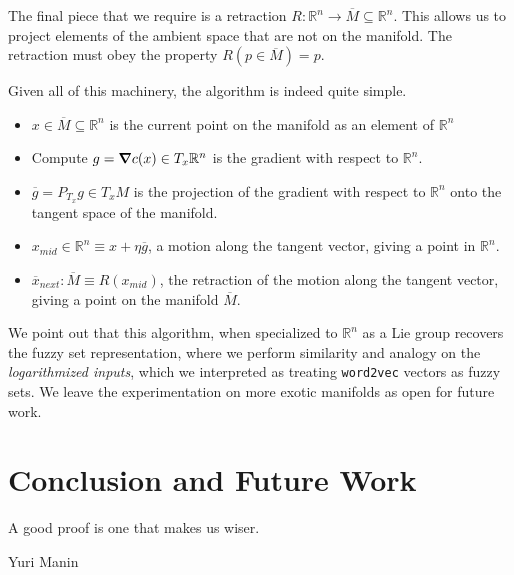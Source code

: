 \documentclass[11pt]{book}
\begin{document}
The final piece that we require is a retraction $R: \mathbb R^n \rightarrow \overline M \subseteq \mathbb R^n$. This allows
us to project elements of the ambient space that are not on the manifold. The
retraction must obey the property $R(p \in \overline M) = p$.

Given all of this machinery, the algorithm is indeed quite simple.

\begin{itemize}
	\item $x \in \overline M \subseteq \mathbb R^n$ is the current point on the manifold as an element of $\mathbb R^n$
	\item Compute $g = \grad c(x) \in T_x \mathbb R^n$ is the gradient with respect to $\mathbb R^n$.
	\item $\overline g = P_{T_x} g \in T_x M$ is the projection of the gradient with respect to $\mathbb R^n$ onto the
	tangent space of the manifold.
	\item $x_{mid}\in \mathbb R^n \equiv x + \eta \overline g$, a motion along the tangent vector, giving a point in
	$\mathbb R^n$.
	\item $\overline x_{next}: \overline M \equiv R(x_{mid})$, the retraction of the motion along the tangent vector,
	giving a point on the manifold $\overline M$.
\end{itemize}


We point out that this algorithm, when specialized to $\mathbb R^n$ as a Lie
group recovers the fuzzy set representation, where we perform similarity and
analogy on the \emph{logarithmized inputs}, which we interpreted as treating
\texttt{word2vec} vectors as fuzzy sets. We leave the experimentation on more
exotic manifolds as open for future work.


\chapter{Conclusion and Future Work}

\epigraph{A good proof is one that makes us wiser.}{Yuri Manin}
\end{document}
